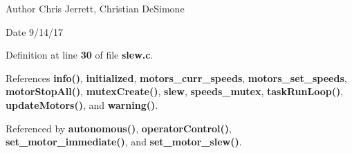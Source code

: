\begin{DoxyAuthor}{Author}
Chris Jerrett, Christian De\+Simone 
\end{DoxyAuthor}
\begin{DoxyDate}{Date}
9/14/17 
\end{DoxyDate}


Definition at line \textbf{ 30} of file \textbf{ slew.\+c}.



References \textbf{ info()}, \textbf{ initialized}, \textbf{ motors\+\_\+curr\+\_\+speeds}, \textbf{ motors\+\_\+set\+\_\+speeds}, \textbf{ motor\+Stop\+All()}, \textbf{ mutex\+Create()}, \textbf{ slew}, \textbf{ speeds\+\_\+mutex}, \textbf{ task\+Run\+Loop()}, \textbf{ update\+Motors()}, and \textbf{ warning()}.



Referenced by \textbf{ autonomous()}, \textbf{ operator\+Control()}, \textbf{ set\+\_\+motor\+\_\+immediate()}, and \textbf{ set\+\_\+motor\+\_\+slew()}.


